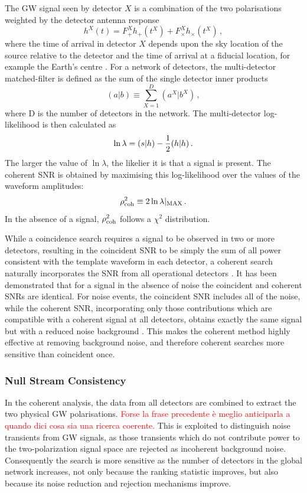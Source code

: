 \documentclass[binding=0.6cm, LaM]{sapthesis}
\newcommand{\fpg}[1]{\textcolor{red}{#1} }
\begin{document}
	The GW signal seen by detector $X$ is a combination of 
	the two polarisations weighted by the detector antenna 
	response
		\begin{equation}
			h^X(t) = F_{+}^X h_{+}(t^X) + F_{\times}^X h_{\times}(t^X)\,, 
		\end{equation}
	where the time of arrival in detector $X$ depends upon the sky location 
	of the source relative to the detector and the time of arrival at a fiducial location, 
	for example the Earth’s centre \cite{45}. 
	For a network of detectors, the multi-detector matched-filter
	is defined as the sum of the single detector inner products
		\begin{equation}
			(a|b) \equiv \sum^D_{X=1} (a^X|b^X)\,,
		\end{equation}
	where D is the number of detectors in the network. The multi-detector log-likelihood is then calculated as
		\begin{equation}
			\ln \lambda = (s|h) - {1 \over 2} (h|h)\,.
		\end{equation}
	The larger the value of $\ln \lambda$, the likelier it is that a signal is present.
	The coherent SNR is obtained by maximising this log-likelihood 
	over the values of the waveform amplitudes:
		\begin{equation}
			\rho^2_{\rm coh}\equiv 2 \ln \lambda |_{\rm MAX}\,.
		\end{equation}
	In the absence of a signal, $\rho^2_{\rm coh}$ follows a $\chi^2$ distribution.

        While a coincidence search requires a signal to be observed in two or more detectors, 
	resulting in the coincident SNR to be simply the sum of all power consistent with the template waveform in each detector,
	a coherent search naturally incorporates the SNR from all operational detectors \cite{45, 46}.
	It has been demonstrated that for a signal in the absence of noise the coincident and coherent SNRs are identical. 
	For noise events, the coincident SNR includes all of the noise, 
	while the coherent SNR, incorporating only those contributions which are compatible 
	with a coherent signal at all detectors, obtains exactly the same signal but with a reduced noise background \cite{45}.
	This makes the coherent method highly effective at removing background noise, and therefore coherent searches more sensitive than coincident once.

\subsubsection{Null Stream Consistency}
	In the coherent analysis, the data from all detectors 
	are combined to extract the two physical GW polarisations.  \fpg{Forse la frase precedente \`e meglio anticiparla a quando dici cosa sia una ricerca coerente.} 
	This is exploited to distinguish noise transients from GW signals, 
	as those transients which do not contribute power to the two-polarization signal space are rejected as incoherent background noise.
	Consequently the search is more sensitive as the number of detectors in the global network increases, not only because the ranking statistic improves, but also because its noise reduction and rejection mechanisms improve.
\end{document}
